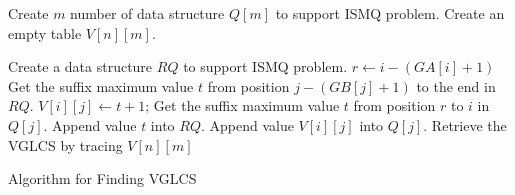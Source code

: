 \begin{algorithm}[t]
\SetAlgoNoLine
{}

Create $m$ number of data structure $Q[m]$ to support ISMQ problem. \;
Create an empty table $V[n][m]$.

 {
  Create a data structure $RQ$ to support ISMQ problem.\;
  $r \gets i - (GA[i]+1)$ \;
   {
     {
        Get the suffix maximum value $t$ from position $j - (GB[j]+1)$ to the end in $RQ$.\;
        $V[i][j] \gets t + 1$;
        Get the suffix maximum value $t$ from position $r$ to $i$ in $Q[j]$.\;
        Append value $t$ into $RQ$. \;
        Append value $V[i][j]$ into $Q[j]$. \;
    }
  }
}
Retrieve the VGLCS by tracing $V[n][m]$\;

  \caption{Algorithm for Finding VGLCS~\cite{Peng2011TheLC}}
  \label{alg:serial-VGLCS}
\end{algorithm}
